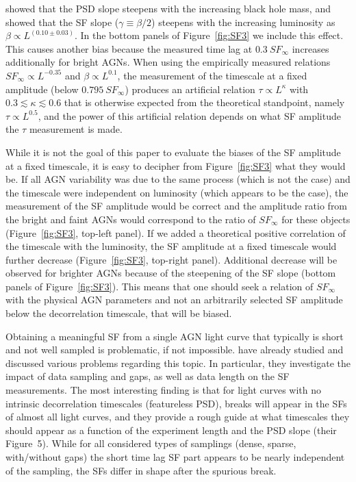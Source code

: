 \documentclass[twocolumn]{aastex6}
\begin{document}
\cite{2016A&A...585A.129S} showed that the PSD slope steepens with the 
increasing black hole mass, and \cite{2016ApJ...826..118K} showed that the SF slope ($\gamma\equiv\beta/2$) steepens with the increasing luminosity as $\beta\propto L^{(0.10\pm0.03)}$.
In the bottom panels of Figure~\ref{fig:SF3}
we include this effect. This causes another bias because the measured time lag at $0.3~SF_\infty$ increases additionally
for bright AGNs. When using the empirically measured  relations $SF_\infty \propto L^{-0.35}$ and $\beta\propto L^{0.1}$, the measurement of the 
timescale at a fixed amplitude (below $0.795~SF_\infty$) produces an artificial relation $\tau \propto L^\kappa$ with $0.3\lesssim \kappa \lesssim 0.6$ 
that is otherwise expected from the theoretical standpoint, 
namely $\tau\propto L^{0.5}$, and the power of this artificial relation depends on what SF amplitude the $\tau$ measurement is made.

While it is not the goal of this paper to evaluate the biases of the SF amplitude at a fixed timescale, it is easy
to decipher from Figure~\ref{fig:SF3} what they would be. If all AGN variability was due to the same process (which is not the case)
and the timescale were independent on luminosity (which appears to be the case), the measurement of the SF amplitude would be correct
and the amplitude ratio from the bright and faint AGNs would correspond to the ratio of $SF_\infty$ for these objects (Figure~\ref{fig:SF3}, top-left panel).
If we added a theoretical positive correlation of the timescale with the luminosity, the SF amplitude at a fixed 
timescale would further decrease (Figure~\ref{fig:SF3}, top-right panel). Additional decrease will be observed for brighter 
AGNs because of the steepening of the SF slope (bottom panels of Figure~\ref{fig:SF3}).
This means that one should seek a relation of $SF_\infty$ with the physical AGN parameters and not an arbitrarily selected SF amplitude below the decorrelation timescale, that will be biased.

Obtaining a meaningful SF from a single AGN light curve that typically is short and not well sampled is problematic, if not impossible.
\cite{2010MNRAS.404..931E} have already studied and discussed various problems regarding this topic. In particular, they 
investigate the impact of data sampling and gaps, as well as data length on the SF measurements. 
The most interesting finding is that for light curves with no intrinsic decorrelation timescales (featureless PSD),
breaks will appear in the SFs of almost all light curves, and they provide a rough guide at what timescales they should appear 
as a function of the experiment length and the PSD slope (their Figure~5). While for all considered types of samplings (dense, sparse, with/without gaps)
the short time lag SF part appears to be nearly independent of the sampling, the SFs differ in shape after the spurious break.
\end{document}

